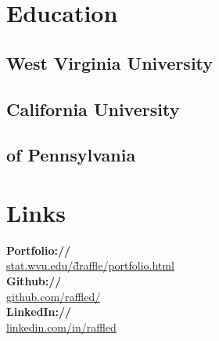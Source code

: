 \documentclass[letterpaper]{deedy-resume} %
\begin{document}
\begin{minipage}[t]{0.35\textwidth} %


\section{Education} 
\subsection{West Virginia University}
\sectionspace %


\subsection{California University}
\subsection{of Pennsylvania}

\sectionspace %


\section{Links} 
{\bf Portfolio://}\\ \href{http://stat.wvu.edu/~draffle/portfolio.html}{stat.wvu.edu/\~draffle/portfolio.html}\\
{\bf Github://}\\ \href{http://github.com/raffled/}{github.com/raffled/}\\
{\bf LinkedIn://}\\ \href{https://www.linkedin.com/in/raffled}{linkedin.com/in/raffled} \\
\sectionspace %



\end{minipage}
\end{document}
